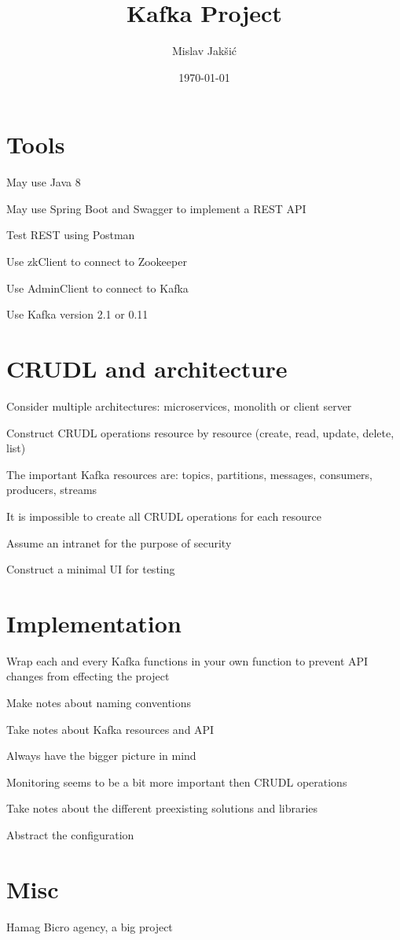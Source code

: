 \documentclass{article}
\title{Kafka Project}
\author{Mislav Jakšić}
\date{\today{}}
\begin{document}
\maketitle

\section{Tools}

May use Java 8

May use Spring Boot and Swagger to implement a REST API

Test REST using Postman

Use zkClient to connect to Zookeeper

Use AdminClient to connect to Kafka

Use Kafka version 2.1 or 0.11

\section{CRUDL and architecture}

Consider multiple architectures: microservices, monolith or client server

Construct CRUDL operations resource by resource (create, read, update, delete, list)

The important Kafka resources are: topics, partitions, messages, consumers, producers, streams

It is impossible to create all CRUDL operations for each resource

Assume an intranet for the purpose of security

Construct a minimal UI for testing

\section{Implementation}

Wrap each and every Kafka functions in your own function to prevent API changes from effecting the project

Make notes about naming conventions

Take notes about Kafka resources and API

Always have the bigger picture in mind

Monitoring seems to be a bit more important then CRUDL operations

Take notes about the different preexisting solutions and libraries

Abstract the configuration

\section{Misc}

Hamag Bicro agency, a big project
\end{document}
